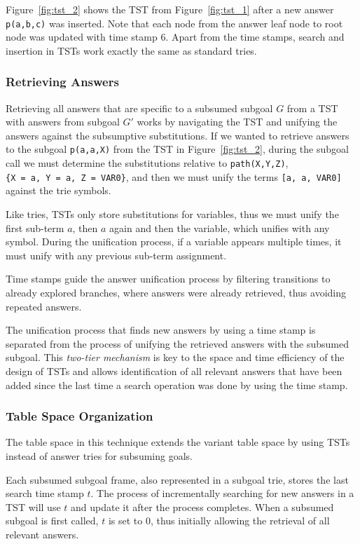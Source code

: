 Figure~\ref{fig:tst_2} shows the TST from Figure~\ref{fig:tst_1} after a new answer \texttt{p(a,b,c)} was inserted.
Note that each node from the answer leaf node to root node was updated with time stamp 6. Apart from
the time stamps, search and insertion in TSTs work exactly the same as standard tries.

\subsubsection{Retrieving Answers}

Retrieving all answers that are specific to a subsumed subgoal $G$ from a TST with answers from subgoal $G'$
works by navigating the TST and unifying the answers against the subsumptive substitutions.
If we wanted to retrieve answers to the subgoal \texttt{p(a,a,X)} from the TST in Figure~\ref{fig:tst_2},
during the subgoal call we must determine the substitutions relative to \texttt{path(X,Y,Z)},
\texttt{\{X~=~a,~Y~=~a,~Z~=~VAR0\}}, and then we must unify the terms \texttt{[a,~a,~VAR0]} against
the trie symbols.

Like tries, TSTs only store substitutions for variables, thus we must unify
the first sub-term $a$, then $a$ again and then the variable, which unifies with any symbol.
During the unification process, if a variable appears multiple times, it must unify with
any previous sub-term assignment.

Time stamps guide the answer unification process by filtering transitions to already explored branches, where
answers were already retrieved, thus avoiding repeated answers.

The unification process that finds new answers by using a time stamp is separated from the process
of unifying the retrieved answers with the subsumed subgoal. This \textit{two-tier mechanism} is key to the space and time
efficiency of the design of TSTs \cite{Johnson-99} and allows identification of all relevant answers that have
been added since the last time a search operation was done by using the time stamp.

\subsubsection{Table Space Organization}

The table space in this technique extends the variant table space by
using TSTs instead of answer tries for subsuming goals.
 
Each subsumed subgoal frame, also represented in a subgoal trie, stores the last search time stamp $t$. The process of
incrementally searching for new answers in a TST will use $t$ and update it after the process completes.
When a subsumed subgoal is first called, $t$ is set to $0$, thus initially allowing the retrieval of all
relevant answers.


